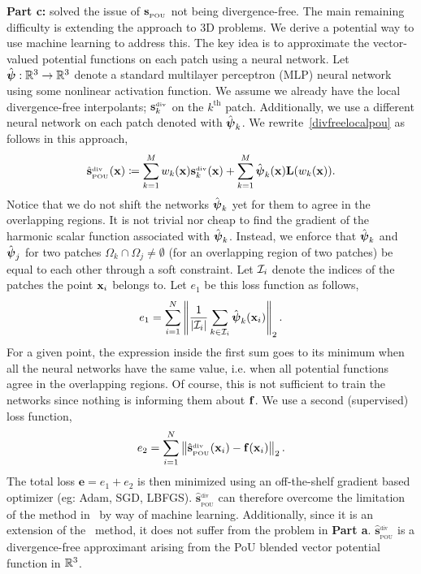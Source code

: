 {\bf Part c:} \citep{drake2021partition} solved the issue of $\mathbf{s}_{_{\text{POU}}}$ not being divergence-free. The main remaining difficulty is extending the approach to 3D problems. We derive a potential way to use machine learning to address this. The key idea is to approximate the vector-valued potential functions on each patch using a neural network. Let $\hat{\boldsymbol{\psi}}: \mathbb{R}^{3} \rightarrow \mathbb{R}^{3}$ denote a standard multilayer perceptron (MLP) neural network using some nonlinear activation function. We assume we already have the local divergence-free interpolants; $\mathbf{s}_k^{_{\text{div}}}$ on the $k^{\text{th}}$ patch. Additionally, we use a different neural network on each patch denoted with $\hat{\boldsymbol{\psi}}_k$. We rewrite~\eqref{divfreelocalpou} as follows in this approach,
\begin{align}
\hat{\mathbf{s}}^{_{\text{div}}}_{_{\text{POU}}}(\mathbf{x}) \coloneqq \sum\limits_{k=1}^{M} w_k(\mathbf{x}) \mathbf{s}_k^{_{\text{div}}}(\mathbf{x}) + \sum\limits_{k=1}^{M} \hat{\boldsymbol{\psi}}_k(\mathbf{x}) \mathbf{L}(w_k(\mathbf{x})). \label{divfreelocalpou_nn}
\end{align}
Notice that we do not shift the networks $\hat{\boldsymbol{\psi}}_k$ yet for them to agree in the overlapping regions. It is not trivial nor cheap to find the gradient of the harmonic scalar function associated with $\hat{\boldsymbol{\psi}}_k$. Instead, we enforce that $\hat{\boldsymbol{\psi}}_k$ and $\hat{\boldsymbol{\psi}}_j$ for two patches $\Omega_k \cap \Omega_j \neq \emptyset$ (for an overlapping region of two patches) be equal to each other through a soft constraint. Let $\mathcal{I}_i$ denote the indices of the patches the point $\mathbf{x}_i$ belongs to. Let $e_1$ be this loss function as follows,
\begin{align}
e_1 = \sum\limits_{i=1}^{N} \left\| \frac{1}{|\mathcal{I}_i|} \sum\limits_{k \in \mathcal{I}_i} \hat{\boldsymbol{\psi}}_k(\mathbf{x}_i) \right\|_2.
\end{align}
For a given point, the expression inside the first sum goes to its minimum when all the neural networks have the same value, i.e. when all potential functions agree in the overlapping regions. Of course, this is not sufficient to train the networks since nothing is informing them about $\mathbf{f}$. We use a second (supervised) loss function,
\begin{align}
e_2 = \sum\limits_{i=1}^{N} \left\| \hat{\mathbf{s}}^{_{\text{div}}}_{_{\text{POU}}}(\mathbf{x}_i) - \mathbf{f}(\mathbf{x}_i) \right\|_2.
\end{align}
The total loss $\mathbf{e} = e_1 + e_2$ is then minimized using an off-the-shelf gradient based optimizer (eg: Adam, SGD, LBFGS). $\hat{\mathbf{s}}^{_{\text{div}}}_{_{\text{POU}}}$ can therefore overcome the limitation of the method in~\citep{drake2021partition} by way of machine learning. Additionally, since it is an extension of the~\citep{drake2021partition} method, it does not suffer from the problem in {\bf Part a}. $\hat{\mathbf{s}}^{_{\text{div}}}_{_{\text{POU}}}$ is a divergence-free approximant arising from the PoU blended vector potential function in $\mathbb{R}^3$.

